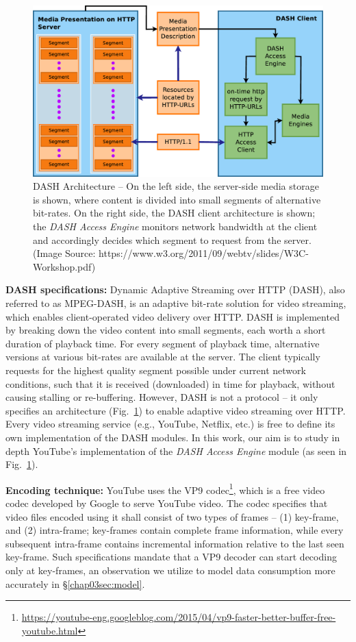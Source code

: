 \begin{figure}[!t]
 \centering
 \includegraphics[width=0.7\linewidth]{img/dash-arch}
 \caption{\small{DASH Architecture -- On the left side, the server-side media storage is shown, where content is divided into small segments of alternative bit-rates. On the right side, the DASH client architecture is shown; the {\it DASH Access Engine} monitors network bandwidth at the client and accordingly decides which segment to request from the server. (Image Source: https://www.w3.org/2011/09/webtv/slides/W3C-Workshop.pdf)}}
 \label{fig:chap03:dash}
\end{figure}
{\bf DASH specifications:} Dynamic Adaptive Streaming over HTTP (DASH), also referred to as MPEG-DASH, is an adaptive bit-rate solution for video streaming, which enables client-operated video delivery over HTTP.
DASH is implemented by breaking down the video content into small segments, each worth a short duration of playback time.
For every segment of playback time, alternative versions at various bit-rates are available at the server.
The client typically requests for the highest quality segment possible under current network conditions, such that it is received (downloaded) in time for playback, without causing stalling or re-buffering. 
However, DASH is not a protocol -- it only specifies an architecture (Fig.~\ref{fig:chap03:dash}) to enable adaptive video streaming over HTTP.
Every video streaming service (e.g., YouTube, Netflix, etc.) is free to define its own implementation of the DASH modules.
In this work, our aim is to study in depth YouTube's implementation of the {\it DASH Access Engine} module (as seen in Fig.~\ref{fig:chap03:dash}).

{\bf Encoding technique:} YouTube uses the VP9 codec\footnote{\url{https://youtube-eng.googleblog.com/2015/04/vp9-faster-better-buffer-free-youtube.html}}, which is a free video codec developed by Google to serve YouTube video.
The codec specifies that video files encoded using it shall consist of two types of frames -- (1) key-frame, and (2) intra-frame; key-frames contain complete frame information, while every subsequent intra-frame contains incremental information relative to the last seen key-frame.
Such specifications mandate that a VP9 decoder can start decoding only at key-frames, an observation we utilize to model data consumption more accurately in \S\ref{chap03sec:model}.


